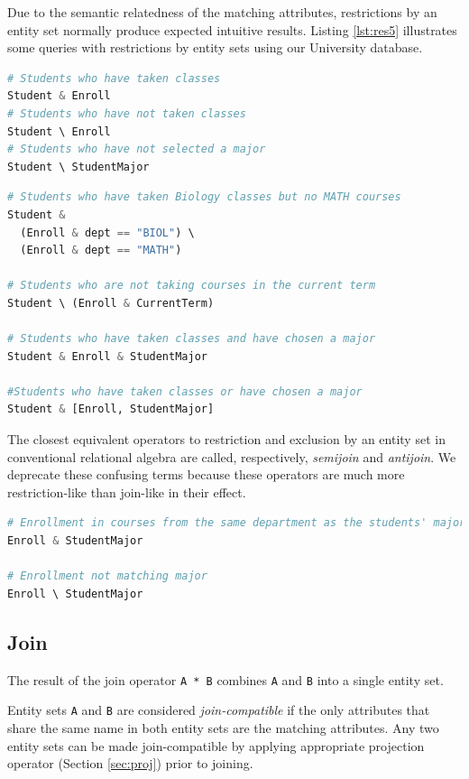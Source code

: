 \documentclass[letter,10pt]{article}
\begin{document}
Due to the semantic relatedness of the matching attributes, restrictions by an entity set normally produce expected intuitive results. 
Listing \ref{lst:res5} illustrates some queries with restrictions by entity sets using our University database.
\begin{lstlisting}[language=Python, caption={Queries with restrictions by entity sets.}, label={lst:res5}]
# Students who have taken classes
Student & Enroll
# Students who have not taken classes
Student \ Enroll
# Students who have not selected a major
Student \ StudentMajor
\end{lstlisting}

\begin{lstlisting}[language=Python, caption={Composite restrictions.}, label={lst:res6}]
# Students who have taken Biology classes but no MATH courses
Student & 
  (Enroll & dept == "BIOL") \ 
  (Enroll & dept == "MATH")

# Students who are not taking courses in the current term
Student \ (Enroll & CurrentTerm)

# Students who have taken classes and have chosen a major
Student & Enroll & StudentMajor 

#Students who have taken classes or have chosen a major
Student & [Enroll, StudentMajor]
\end{lstlisting}

The closest equivalent operators to restriction and exclusion by an entity set in conventional relational algebra are called, respectively, \emph{semijoin} and \emph{antijoin}.
We deprecate these confusing terms because these operators are much more restriction-like than join-like in their effect.

\begin{lstlisting}[language=Python, caption={Avoiding unintended restrictions.}, label={lst:res7}]
# Enrollment in courses from the same department as the students' major
Enroll & StudentMajor

# Enrollment not matching major 
Enroll \ StudentMajor 
\end{lstlisting}

\subsection{Join}\label{sec:join}
The result of the join operator \lstinline$A * B$ combines \lstinline$A$ and \lstinline$B$ into a single entity set.

Entity sets \lstinline$A$ and \lstinline$B$ are considered \emph{join-compatible} if the only attributes that share the same name in both entity sets are the matching attributes.
Any two entity sets can be made join-compatible by applying appropriate projection operator (Section \ref{sec:proj}) prior to joining.
\end{document}
